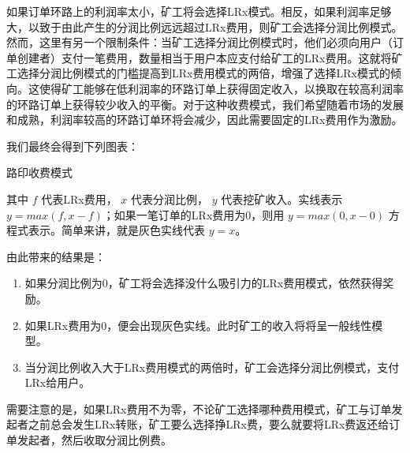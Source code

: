 \documentclass[UTF8]{ctexart}
\makeatletter
\newenvironment{figurehere}
 {\def\@captype{figure}}
 {}
\makeatother
\begin{document}
\begin{multicols}{2}
如果订单环路上的利润率太小，矿工将会选择LRx模式。相反，如果利润率足够大，以致于由此产生的分润比例远远超过LRx费用，则矿工会选择分润比例模式。然而，这里有另一个限制条件：当矿工选择分润比例模式时，他们必须向用户（订单创建者）支付一笔费用，数量相当于用户本应支付给矿工的LRx费用。这就将矿工选择分润比例模式的门槛提高到LRx费用模式的两倍，增强了选择LRx模式的倾向。这使得矿工能够在低利润率的环路订单上获得固定收入，以换取在较高利润率的环路订单上获得较少收入的平衡。对于这种收费模式，我们希望随着市场的发展和成熟，利润率较高的环路订单环将会减少，因此需要固定的LRx费用作为激励。


我们最终会得到下列图表：


\begin{center}
\begin{figurehere}
\centering
{}
\caption{路印收费模式}
\label{fig:feemodel}
\end{figurehere}
\end{center}

其中 $f$ 代表LRx费用， $x$ 代表分润比例， $y$ 代表挖矿收入。实线表示 $y=max(f, x-f)$；如果一笔订单的LRx费用为0，则用 $y=max(0, x - 0)$ 方程式表示。简单来讲，就是灰色实线代表 $y=x$。


由此带来的结果是： 
\begin{enumerate}
	\item 如果分润比例为0，矿工将会选择没什么吸引力的LRx费用模式，依然获得奖励。
	\item 如果LRx费用为0，便会出现灰色实线。此时矿工的收入将将呈一般线性模型。
	\item 当分润比例收入大于LRx费用模式的两倍时，矿工会选择分润比例模式，支付LRx给用户。
\end{enumerate}

需要注意的是，如果LRx费用不为零，不论矿工选择哪种费用模式，矿工与订单发起者之前总会发生LRx转账，矿工要么选择挣LRx费，要么就要将LRx费返还给订单发起者，然后收取分润比例费。


\end{multicols}
\end{document}
